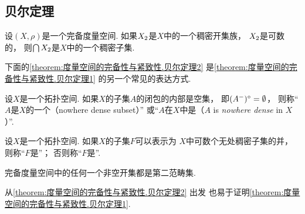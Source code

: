 \subsection{贝尔定理}
\begin{theorem}[贝尔定理]\label{theorem:度量空间的完备性与紧致性.贝尔定理1}
设\((X,\rho)\)是一个完备度量空间.
如果\(X_2\)是\(X\)中的一个稠密开集族，
\(X_2\)是可数的，
则\(\bigcap X_2\)是\(X\)中的一个稠密子集.
\end{theorem}

下面的\cref{theorem:度量空间的完备性与紧致性.贝尔定理2}
是\cref{theorem:度量空间的完备性与紧致性.贝尔定理1} 的另一个常见的表达方式.
\begin{definition}
设\(X\)是一个拓扑空间.
如果\(X\)的子集\(A\)的闭包的内部是空集，
即\((A^-)^\circ = \emptyset\)，
则称“\(A\)是\(X\)的一个（nowhere dense subset）”
或“\(A\)在\(X\)中是（\(A\) is \emph{nowhere dense} in \(X\)）”.
\end{definition}

\begin{definition}
设\(X\)是一个拓扑空间.
如果\(X\)的子集\(F\)可以表示为
\(X\)中可数个无处稠密子集的并，
则称“\(F\)是”；
否则称“\(F\)是”.
\end{definition}

\begin{theorem}[贝尔定理]\label{theorem:度量空间的完备性与紧致性.贝尔定理2}
完备度量空间中的任何一个非空开集都是第二范畴集.
\end{theorem}

从\cref{theorem:度量空间的完备性与紧致性.贝尔定理2} 出发
也易于证明\cref{theorem:度量空间的完备性与紧致性.贝尔定理1}.

